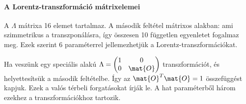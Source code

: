    \paragraph{A Lorentz-transzformáció mátrixelemei}
    
    A $\Lambda$ mátrixa 16 elemet tartalmaz.
   A második feltétel mátrixos alakban:
    ami szimmetrikus a transzponálásra, így összesen 10 független egyenletet fogalmaz meg.
   Ezek szerint 6 paraméterrel jellemezhetjük a Lorentz-transzformációkat. 
    
    Ha veszünk egy speciális alakú 
    $\Lambda=\begin{pmatrix}
              1 & 0 \\
              0 & \mat{O}
             \end{pmatrix}$
    transzformációt, és helyettesítsük a második feltételbe. Így az $\mat{O}^T\mat{O}=1$ összefüggést kapjuk.
   Ezek a valós térbeli forgatásokat írják le.
   A hat paraméterből három ezekhez a transzformációkhoz tartozik.
    
